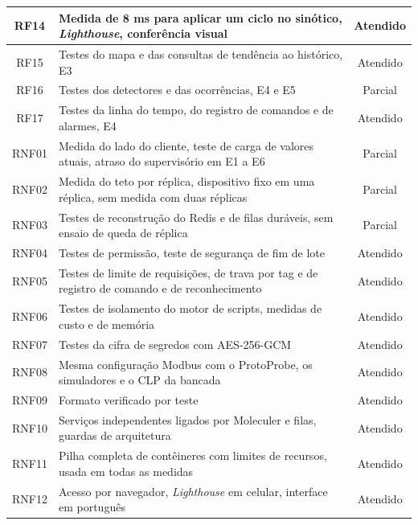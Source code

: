 {\begin{xltabular}{\textwidth}{cXc}
        \hline
        RF14 & Medida de 8 ms para aplicar um ciclo no sinótico, \emph{Lighthouse}, conferência visual & Atendido \\
        \hline
        RF15 & Testes do mapa e das consultas de tendência ao histórico, E3 & Atendido \\
        \hline
        RF16 & Testes dos detectores e das ocorrências, E4 e E5 & Parcial \\
        \hline
        RF17 & Testes da linha do tempo, do registro de comandos e de alarmes, E4 & Atendido \\
        \hline
        RNF01 & Medida do lado do cliente, teste de carga de valores atuais, atraso do supervisório em E1 a E6 & Parcial \\
        \hline
        RNF02 & Medida do teto por réplica, dispositivo fixo em uma réplica, sem medida com duas réplicas & Parcial \\
        \hline
        RNF03 & Testes de reconstrução do Redis e de filas duráveis, sem ensaio de queda de réplica & Parcial \\
        \hline
        RNF04 & Testes de permissão, teste de segurança de fim de lote & Atendido \\
        \hline
        RNF05 & Testes de limite de requisições, de trava por tag e de registro de comando e de reconhecimento & Atendido \\
        \hline
        RNF06 & Testes de isolamento do motor de scripts, medidas de custo e de memória & Atendido \\
        \hline
        RNF07 & Testes da cifra de segredos com AES-256-GCM & Atendido \\
        \hline
        RNF08 & Mesma configuração Modbus com o ProtoProbe, os simuladores e o CLP da bancada & Atendido \\
        \hline
        RNF09 & Formato  verificado por teste & Atendido \\
        \hline
        RNF10 & Serviços independentes ligados por Moleculer e filas, guardas de arquitetura & Atendido \\
        \hline
        RNF11 & Pilha completa de contêineres com limites de recursos, usada em todas as medidas & Atendido \\
        \hline
        RNF12 & Acesso por navegador, \emph{Lighthouse} em celular, interface em português & Atendido \\
        \hline
\end{xltabular}}

